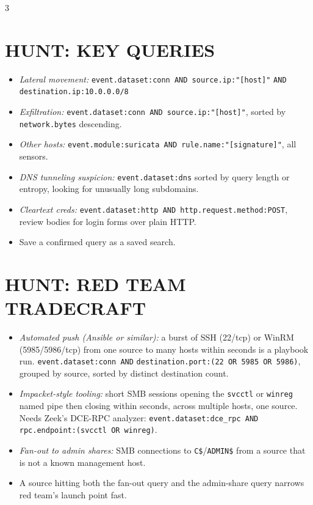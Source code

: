 \documentclass[7pt,landscape]{article}
\begin{document}
\begin{multicols*}{3}
\section{HUNT: KEY QUERIES}
\begin{itemize}
    \item \textit{Lateral movement:} \texttt{event.dataset:conn AND source.ip:"[host]"} \newline \texttt{AND destination.ip:10.0.0.0/8}
    \item \textit{Exfiltration:} \texttt{event.dataset:conn AND source.ip:"[host]"}, sorted by \texttt{network.bytes} descending.
    \item \textit{Other hosts:} \texttt{event.module:suricata AND rule.name:"[signature]"}, all sensors.
    \item \textit{DNS tunneling suspicion:} \texttt{event.dataset:dns} sorted by query length or entropy, looking for unusually long subdomains.
    \item \textit{Cleartext creds:} \texttt{event.dataset:http AND http.request.method:POST}, review bodies for login forms over plain HTTP.
    \item Save a confirmed query as a saved search.
\end{itemize}

\section{HUNT: RED TEAM TRADECRAFT}
\begin{itemize}
    \item \textit{Automated push (Ansible or similar):} a burst of SSH (22/tcp) or WinRM (5985/5986/tcp) from one source to many hosts within seconds is a playbook run. \texttt{event.dataset:conn AND} \newline \texttt{destination.port:(22 OR 5985 OR 5986)}, grouped by source, sorted by distinct destination count.
    \item \textit{Impacket-style tooling:} short SMB sessions opening the \texttt{svcctl} or \texttt{winreg} named pipe then closing within seconds, across multiple hosts, one source. Needs Zeek's DCE-RPC analyzer: \texttt{event.dataset:dce\_rpc AND} \newline \texttt{rpc.endpoint:(svcctl OR winreg)}.
    \item \textit{Fan-out to admin shares:} SMB connections to \texttt{C\$}/\texttt{ADMIN\$} from a source that is not a known management host.
    \item A source hitting both the fan-out query and the admin-share query narrows red team's launch point fast.
\end{itemize}


\end{multicols*}
\end{document}
